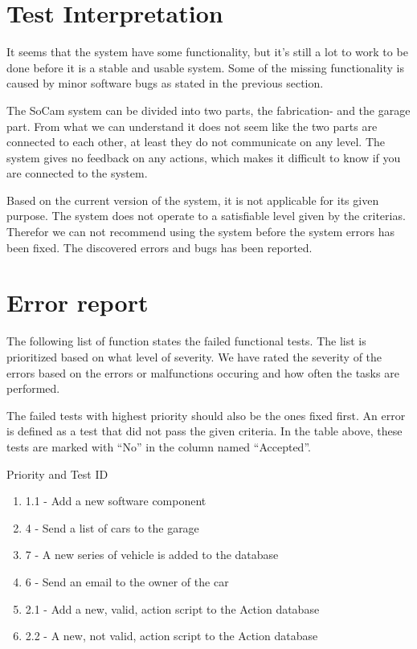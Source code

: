 	\section{Test Interpretation}

		It seems that the system have some functionality, but it’s still a lot to work to be done before it is a stable and usable system. Some of the missing functionality is caused by minor software bugs as stated in the previous section.

		The SoCam system can be divided into two parts, the fabrication- and the garage part. From what we can understand it does not seem like the two parts are connected to each other, at least they do not communicate on any level.  The system gives no feedback on any actions, which makes it difficult to know if you are connected to the system. 

		Based on the current version of the system, it is not applicable for its given purpose. The system does not operate to a satisfiable level given by the criterias. Therefor we can not recommend using the system before the system errors has been fixed. The discovered errors and bugs has been reported. 

	\clearpage
	\section{Error report}

		The following list of function states the failed functional tests. The list is prioritized based on what level of severity. We have rated the severity of the errors based on the errors or malfunctions occuring and how often the tasks are performed. 

		The failed tests with highest priority should also be the ones fixed first. An error is defined as a test that did not pass the given criteria. In the table above, these tests are marked with “No” in the column named “Accepted”. 

		Priority and Test ID
		\begin{enumerate}
			\item 1.1 - Add a new software component
			\item 4 - Send a list of cars to the garage
			\item 7 - A new series of vehicle is added to the database
			\item 6 - Send an email to the owner of the car
			\item 2.1 - Add a new, valid, action script to the Action database
			\item 2.2 - A new, not valid, action script to the Action database

		\end{enumerate}	


